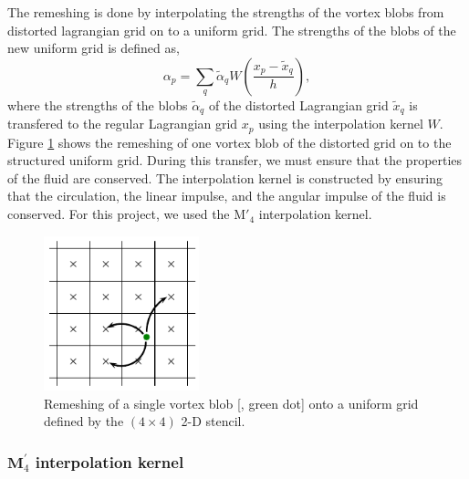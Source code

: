 The remeshing is done by interpolating the strengths of the vortex blobs from distorted lagrangian grid on to a uniform grid. The strengths of the blobs of the new uniform grid is defined as,
	\begin{equation}
	\alpha_p = \sum_q\tilde{\alpha}_q W \left(\frac{x_p - \tilde{x}_q}{h}\right),
	\end{equation}
where the strengths of the blobs $\tilde{\alpha}_q$ of the distorted Lagrangian grid $\tilde{x}_q$ is transfered to the regular Lagrangian grid $x_p$ using the interpolation kernel $W$. Figure \ref{fig:interpolationGrid} shows the remeshing of one vortex blob of the distorted grid on to the structured uniform grid. During this transfer, we must ensure that the properties of the fluid are conserved. The interpolation kernel is constructed by ensuring that the circulation, the linear impulse, and the angular impulse of the fluid is conserved. For this project, we used the $\mathrm{M}'_4$ interpolation kernel.

	\begin{figure}[t]
	\centering
	\includegraphics[width=0.4\textwidth]{figures/lagrangian/interpolationGrid.pdf}
	\caption{Remeshing of a single vortex blob [{\color{plotGreen}{$\bullet$}}, green dot] onto a uniform grid defined by the $\left(4\times4\right)$ 2-D stencil.}
	\label{fig:interpolationGrid}
	\end{figure}

\subsubsection*{$\mathbf{M}^\prime_4$ interpolation kernel}

